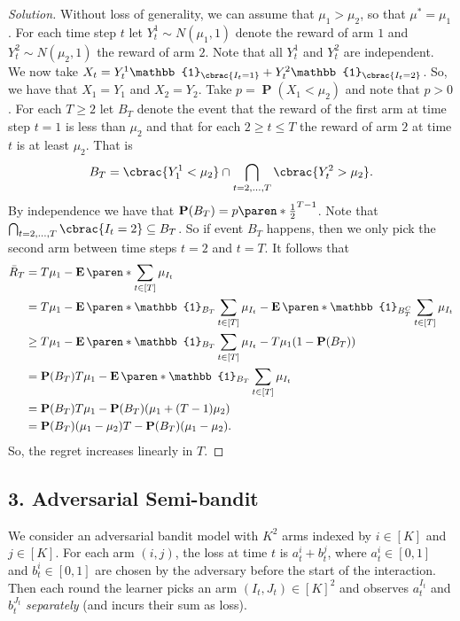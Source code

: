 \documentclass[10pt, a4paper, twoside]{amsart}
\theoremstyle{plain}
\DeclarePairedDelimiter\cbrac\{\}
\DeclarePairedDelimiter\paren()
\newcommand{\se}{\ensuremath{\subseteq}}
\newcommand{\Ind}{\ensuremath{\mathbb{1}}}
\renewcommand{\P}{\operatorname*{\ensuremath{\mathbf{P}}}} %
\newcommand{\Ev}{\operatorname*{\ensuremath{\mathbf{E}}}} %
\newenvironment{solution}
               {\let\oldqedsymbol=\qedsymbol
                \renewcommand{\qedsymbol}{$\blacktriangleleft$}
                \begin{proof}[Solution]}
               {\end{proof}
                \renewcommand{\qedsymbol}{\oldqedsymbol}}
\begin{document}
\begin{solution}
Without loss of generality, we can assume that $\mu_1 > \mu_2$, so that $\mu^*=\mu_1$.
For each time step $t$ let $Y_t^1 \sim N(\mu_1, 1)$ denote the reward of arm $1$ and $Y_t^2 \sim N(\mu_2, 1)$ the reward of arm $2$. Note that all $Y_t^1$ and $Y_t^2$ are independent. We now take $X_t=Y_t^1 \Ind_{\cbrac{I_t=1}}+Y_t^2 \Ind_{\cbrac{I_t=2}}$.
So, we have that $X_1 = Y_1$ and $X_2=Y_2$. Take $p=\P(X_1 < \mu_2)$ and note that $p > 0$.
For each $T \geq 2$ let $B_T$ denote the event that the reward of the first arm at time step $t=1$ is less than $\mu_2$ and 
that for each $2 \geq t \leq T$ the reward of arm $2$ at time $t$ is at least $\mu_2$. That is
\begin{equation*}
 B_T= \cbrac{Y^1_1 < \mu_2} \cap \bigcap_{t=2,\ldots,T}\cbrac{Y_t^2 > \mu_2}.
\end{equation*}
By independence we have that $\P(B_T)=p\paren*{\tfrac{1}{2}}^{T-1}$.
Note that $\bigcap_{t=2,\ldots,T}\cbrac{I_t=2} \se B_T$. 
So if event $B_T$ happens, then we only pick the second arm between time steps $t=2$ and $t=T$.
It follows that 
\begin{align*}
 \bar{R}_T &= T \mu_1 - \Ev\paren*{\sum_{t \in [T]} \mu_{I_t}} \\
 &= T \mu_1 - \Ev\paren*{\Ind_{B_T}\sum_{t \in [T]} \mu_{I_t}}-\Ev\paren*{\Ind_{B_T^C}\sum_{t \in [T]} \mu_{I_t}} \\
 &\geq T \mu_1 - \Ev\paren*{\Ind_{B_T}\sum_{t \in [T]} \mu_{I_t}}-T\mu_1(1-\P(B_T)) \\
 &= \P(B_T)T \mu_1 - \Ev\paren*{\Ind_{B_T}\sum_{t \in [T]} \mu_{I_t}} \\
 &= \P(B_T)T \mu_1 - \P(B_T)(\mu_1+(T-1)\mu_{2})  \\
 &= \P(B_T) (\mu_1-\mu_2)T - \P(B_T)(\mu_1-\mu_2).
\end{align*}
So, the regret increases linearly in $T$.
\end{solution}



\subsection*{3. Adversarial Semi-bandit}
We consider an adversarial bandit model with $K^2$ arms indexed by $i \in [K]$ and $j \in [K]$. For each arm $(i,j)$, the loss at time $t$ is $a_t^i + b_t^j$, where $a_t^i \in [0,1]$ and $b_t^i \in [0,1]$ are chosen by the adversary before the start of the interaction. Then each round the learner picks an arm $(I_t, J_t) \in [K]^2$ and observes $a_t^{I_t}$ and $b_t^{J_t}$ \textit{separately} (and incurs their sum as loss).
\end{document}
